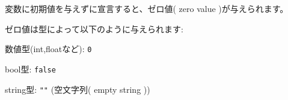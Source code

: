 変数に初期値を与えずに宣言すると、ゼロ値( zero value )が与えられます。

ゼロ値は型によって以下のように与えられます:

\begin{description}
    \item 数値型(int,floatなど): \texttt{0}
    \item bool型: \texttt{false}
    \item string型: \texttt{""} (空文字列( empty string ))
\end{description}